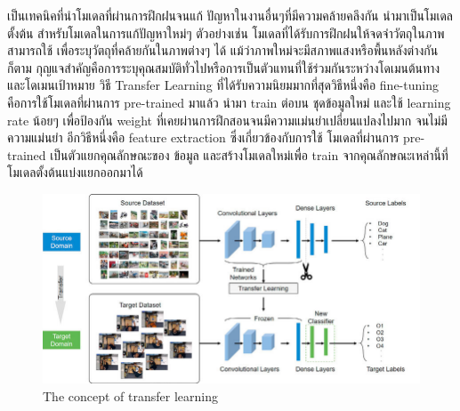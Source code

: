  

เป็นเทคนิคที่นำโมเดลที่ผ่านการฝึกฝนจนแก้ ปัญหาในงานอื่นๆที่มีความคล้ายคลึงกัน
นำมาเป็นโมเดลตั้งต้น สำหรับโมเดลในการแก้ปัญหาใหม่ๆ
ตัวอย่างเช่น โมเดลที่ได้รับการฝึกฝนให้จดจำวัตถุในภาพสามารถใช้
เพื่อระบุวัตถุที่คล้ายกันในภาพต่างๆ ได้ 
แม้ว่าภาพใหม่จะมีสภาพแสงหรือพื้นหลังต่างกันก็ตาม
 กุญแจสำคัญคือการระบุคุณสมบัติทั่วไปหรือการเป็นตัวแทนที่ใช้ร่วมกันระหว่างโดเมนต้นทางและโดเมนเป้าหมาย
 วิธี Transfer Learning ที่ได้รับความนิยมมากที่สุดวิธีหนึ่งคือ fine-tuning 
คือการใช้โมเดลที่ผ่านการ  pre-trained  มาแล้ว นำมา train ต่อบน ชุดข้อมูลใหม่
และใช้ learning rate น้อยๆ เพื่อป้องกัน weight ที่เคยผ่านการฝึกสอนจนมีความแม่นยำเปลี่ยนแปลงไปมาก จนไม่มีความแม่นยำ
อีกวิธีหนึ่งคือ feature extraction ซึ่งเกี่ยวข้องกับการใช้ โมเดลที่ผ่านการ  pre-trained  เป็นตัวแยกคุณลักษณะของ ข้อมูล และสร้างโมเดลใหม่เพื่อ train จากคุณลักษณะเหล่านี้ที่โมเดลตั้งต้นแบ่งแยกออกมาได้
 
\begin{figure}[h]
  \begin{center}
  \includegraphics[scale=0.45]{pic/The-architecture-transfer-learning.png}
  \end{center}
  
  \caption[The concept of transfer learning]{The concept of transfer learning}
  \label{fig:The concept of transfer learning}
  \end{figure}

